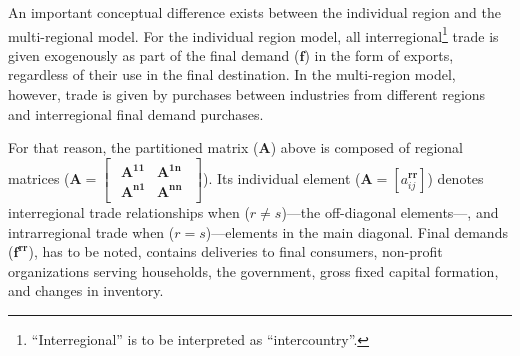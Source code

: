 \documentclass[a4paper,12pt]{article}
\begin{document}
An important conceptual difference exists between the individual region and the multi-regional model. For the individual region model, all interregional\footnote{``Interregional'' is to be interpreted as ``intercountry''.} trade is given exogenously as part of the final demand ($\mathbf{f}$) in the form of exports, regardless of their use in the final destination. In the multi-region model, however, trade is given by purchases between industries from different regions and interregional final demand purchases. 

For that reason, the partitioned matrix ($\mathbf{A}$) above is composed of regional matrices ($\mathbf{A}=\begin{bmatrix}
\begin{smallmatrix} \mathbf{A^{11}}&\mathbf{A^{1n}}\\ \mathbf{A^{n1}}&\mathbf{A^{nn}} \end{smallmatrix} \end{bmatrix}$). Its individual element ($\mathbf{A} = [a^{\mathbf{rr}}_{ij}]$) denotes interregional trade relationships when ($r \not= s$)---the off-diagonal elements---, and intrarregional trade when ($r=s$)---elements in the main diagonal. Final demands ($\mathbf{f^{rr}}$), has to be noted, contains deliveries to final consumers, non-profit organizations serving households, the government, gross fixed capital formation, and changes in inventory.
\end{document}
